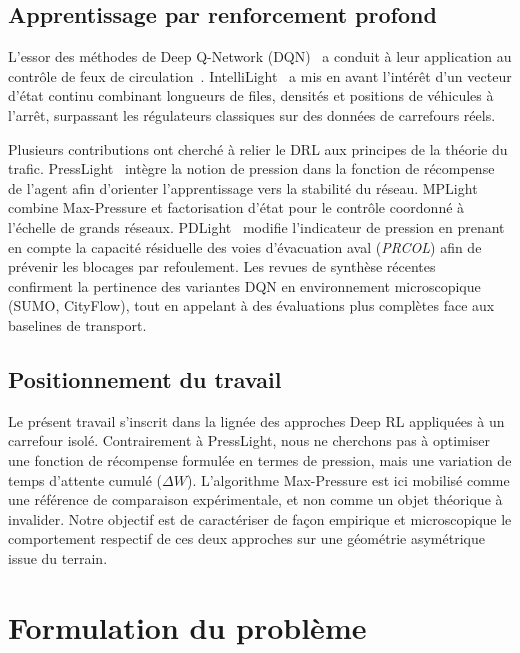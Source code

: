 \documentclass[10pt,twocolumn,letterpaper]{article}
\begin{document}
\subsection{Apprentissage par renforcement profond}
L'essor des méthodes de Deep Q-Network (DQN)~\cite{mnih2015human} a conduit à leur application au contrôle de feux de circulation~\cite{genders2016using}. IntelliLight~\cite{wei2018intellilight} a mis en avant l'intérêt d'un vecteur d'état continu combinant longueurs de files, densités et positions de véhicules à l'arrêt, surpassant les régulateurs classiques sur des données de carrefours réels.

Plusieurs contributions ont cherché à relier le DRL aux principes de la théorie du trafic. PressLight~\cite{wei2019presslight} intègre la notion de pression dans la fonction de récompense de l'agent afin d'orienter l'apprentissage vers la stabilité du réseau. MPLight~\cite{chen2020toward} combine Max-Pressure et factorisation d'état pour le contrôle coordonné à l'échelle de grands réseaux. PDLight~\cite{zhang2020pdlight} modifie l'indicateur de pression en prenant en compte la capacité résiduelle des voies d'évacuation aval (\emph{PRCOL}) afin de prévenir les blocages par refoulement. Les revues de synthèse récentes~\cite{wei2021survey,zhao2024survey} confirment la pertinence des variantes DQN en environnement microscopique (SUMO, CityFlow), tout en appelant à des évaluations plus complètes face aux baselines de transport.

\subsection{Positionnement du travail}
Le présent travail s'inscrit dans la lignée des approches Deep RL appliquées à un carrefour isolé. Contrairement à PressLight, nous ne cherchons pas à optimiser une fonction de récompense formulée en termes de pression, mais une variation de temps d'attente cumulé ($\Delta W$). L'algorithme Max-Pressure est ici mobilisé comme une référence de comparaison expérimentale, et non comme un objet théorique à invalider. Notre objectif est de caractériser de façon empirique et microscopique le comportement respectif de ces deux approches sur une géométrie asymétrique issue du terrain.

\section{Formulation du problème}
\label{sec:formulation}
\end{document}
